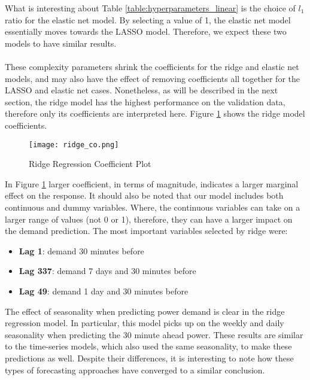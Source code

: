 \documentclass[11pt]{article}
\begin{document}
\noindent What is interesting about Table \ref{table:hyperparameters_linear} is the choice of $l_1$ ratio for the elastic net model. By selecting a value of 1, the elastic net model essentially moves towards the LASSO model. Therefore, we expect these two models to have similar results.
\\
\\
These complexity parameters shrink the coefficients for the ridge and elastic net models, and may also have the effect of removing coefficients all together for the LASSO and elastic net cases. Nonetheless, as will be described in the next section, the ridge model has the highest performance on the validation data, therefore only its coefficients are interpreted here. Figure \ref{fig:ridge_co} shows the ridge model coefficients.  


\begin{figure}[htpb!]
\centering
\begin{minipage}{.9\textwidth}
  \centering
  \texttt{[image: ridge\_co.png]}
   \caption{Ridge Regression Coefficient Plot}
   \label{fig:ridge_co}
\end{minipage}%
\end{figure}


\noindent In Figure \ref{fig:ridge_co} larger coefficient, in terms of magnitude, indicates a larger marginal effect on the response. It should also be noted that our model includes both continuous and dummy variables. Where, the continuous variables can take on a larger range of values (not 0 or 1), therefore, they can have a larger impact on the demand prediction. The most important variables selected by ridge were:

\begin{itemize}
\item \textbf{Lag 1}: demand 30 minutes before
\item \textbf{Lag 337}: demand 7 days and 30 minutes before
\item \textbf{Lag 49}: demand 1 day and 30 minutes before
\end{itemize}

\noindent The effect of seasonality when predicting power demand is clear in the ridge regression model. In particular, this model picks up on the weekly and daily seasonality when predicting the 30 minute ahead power. These results are similar to the time-series models, which also used the same seasonality, to make these predictions as well. Despite their differences, it is interesting to note how these types of forecasting approaches have converged to a similar conclusion.
\end{document}
